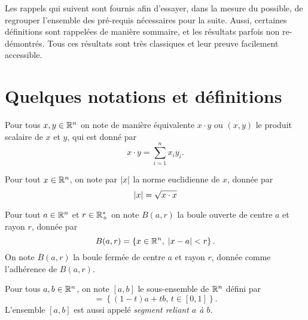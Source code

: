 

Les rappels qui suivent sont fournis afin d'essayer, dans la mesure du possible, de regrouper l'ensemble des pré-requis nécessaires pour la suite. Aussi, certaines définitions sont rappelées de manière sommaire, et les résultats parfois non re-démontrés. Tous ces résultats sont très classiques et leur preuve facilement accessible.

\section{Quelques notations et définitions}

\begin{notation}
Pour tous \(x,y\in \mathbb{R}^n\) on note de manière équivalente \(x\cdot y\)  ou \((x,y)\) le produit scalaire de \(x\) et \(y\), qui est donné par
\begin{equation*}
x\cdot y = \sum_{i=1}^n x_i y_i.
\end{equation*}
\end{notation}

\begin{notation}
Pour tout \(x\in\mathbb{R}^n\), on note par \(\mathopen{}\left|x\right|\mathclose{}\) la norme euclidienne de \(x\), donnée par
\begin{equation*}
\mathopen{}\left|x\right|\mathclose{} = \sqrt{x\cdot x}
\end{equation*}
\end{notation}

\begin{notation}
Pour tout \(a\in\mathbb{R}^n\) et \(r\in\mathbb{R}^*_+\) on note \(B(a,r)\) la boule ouverte de centre \(a\) et rayon \(r\), donnée par
\begin{equation*}
B(a,r) = \left\{x\in \mathbb{R}^n,\; \mathopen{}\left|x-a\right|\mathclose{} < r \right\}.
\end{equation*}
On note \(\overline{B}(a,r)\) la boule fermée de centre \(a\) et rayon \(r\), donnée comme l'adhérence de \(B(a,r)\).
\end{notation}

\begin{notation}
Pour tous \(a,b\in\mathbb{R}^n\), on note \([a, b]\) le sous-ensemble de \(\mathbb{R}^n\) défini par 
\begin{equation*}
[a,b] = \left\{(1-t)a+t b,\, t\in[0,1]\right\}.
\end{equation*}
L'ensemble \([a, b]\) est aussi appelé \textit{segment reliant \(a\) à \(b\)}.
\end{notation}





